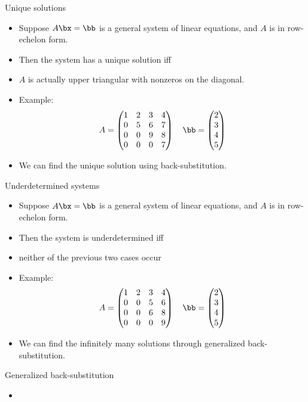 \documentclass{beamer}
\begin{document}

\begin{frame}{Unique solutions}

\begin{itemize}
\item Suppose $A\bx=\bb$ is a general system of linear equations, and $A$ is in row-echelon form.
\item Then the system has a unique solution iff
\item $A$ is actually upper triangular with nonzeros on the diagonal.
\item Example:
$$
A =
\begin{pmatrix}
1 & 2 & 3 & 4 \\
0 & 5 & 6 & 7 \\
0 & 0 & 9 & 8 \\
0 & 0 & 0 & 7 \\
\end{pmatrix}
\quad
\bb=
\begin{pmatrix}
2 \\ 3 \\ 4 \\ 5
\end{pmatrix}
$$
\item We can find the unique solution using back-substitution.

\end{itemize}
\end{frame}

\begin{frame}{Underdetermined systems}

\begin{itemize}
\item Suppose $A\bx=\bb$ is a general system of linear equations, and $A$ is in row-echelon form.
\item Then the system is underdetermined iff
\item neither of the previous two cases occur
\item Example:
$$
A =
\begin{pmatrix}
1 & 2 & 3 & 4 \\
0 & 0 & 5 & 6 \\
0 & 0 & 6 & 8 \\
0 & 0 & 0 & 9 \\
\end{pmatrix}
\quad
\bb=
\begin{pmatrix}
2 \\ 3 \\ 4 \\ 5
\end{pmatrix}
$$
\item We can find the infinitely many solutions through generalized back-substitution.

\end{itemize}
\end{frame}

\begin{frame}{Generalized back-substitution}

\begin{itemize}
\item
\end{itemize}
\end{frame}
\end{document}
